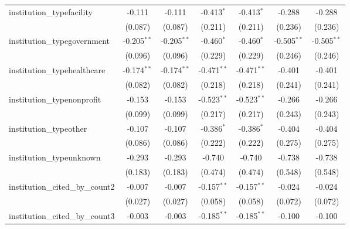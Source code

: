 \begin{tabular}{lcccccc}
   institution\_typefacility             & -0.111         & -0.111         & -0.413$^{*}$   & -0.413$^{*}$   & -0.288         & -0.288\\   
                                         & (0.087)        & (0.087)        & (0.211)        & (0.211)        & (0.236)        & (0.236)\\   
   institution\_typegovernment           & -0.205$^{**}$  & -0.205$^{**}$  & -0.460$^{*}$   & -0.460$^{*}$   & -0.505$^{**}$  & -0.505$^{**}$\\   
                                         & (0.096)        & (0.096)        & (0.229)        & (0.229)        & (0.246)        & (0.246)\\   
   institution\_typehealthcare           & -0.174$^{**}$  & -0.174$^{**}$  & -0.471$^{**}$  & -0.471$^{**}$  & -0.401         & -0.401\\   
                                         & (0.082)        & (0.082)        & (0.218)        & (0.218)        & (0.241)        & (0.241)\\   
   institution\_typenonprofit            & -0.153         & -0.153         & -0.523$^{**}$  & -0.523$^{**}$  & -0.266         & -0.266\\   
                                         & (0.099)        & (0.099)        & (0.217)        & (0.217)        & (0.243)        & (0.243)\\   
   institution\_typeother                & -0.107         & -0.107         & -0.386$^{*}$   & -0.386$^{*}$   & -0.404         & -0.404\\   
                                         & (0.086)        & (0.086)        & (0.222)        & (0.222)        & (0.275)        & (0.275)\\   
   institution\_typeunknown              & -0.293         & -0.293         & -0.740         & -0.740         & -0.738         & -0.738\\   
                                         & (0.183)        & (0.183)        & (0.474)        & (0.474)        & (0.548)        & (0.548)\\   
   institution\_cited\_by\_count2        & -0.007         & -0.007         & -0.157$^{**}$  & -0.157$^{**}$  & -0.024         & -0.024\\   
                                         & (0.027)        & (0.027)        & (0.058)        & (0.058)        & (0.072)        & (0.072)\\   
   institution\_cited\_by\_count3        & -0.003         & -0.003         & -0.185$^{**}$  & -0.185$^{**}$  & -0.100         & -0.100\\   

\end{tabular}
